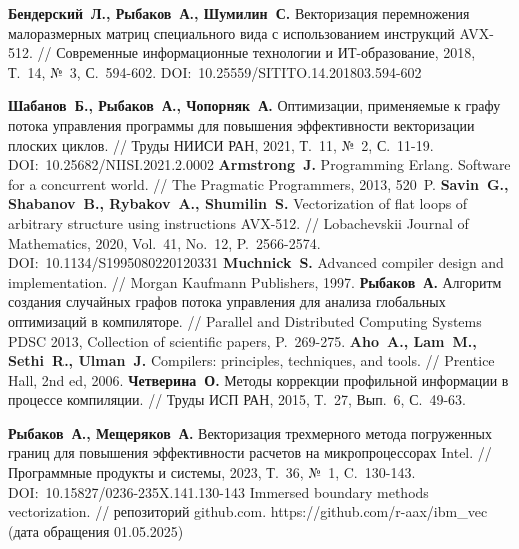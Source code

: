 \begin{thebibliography}{99}
%
\textbf{Бендерский~Л., Рыбаков~А., Шумилин~С.} Векторизация перемножения малоразмерных матриц специального вида с использованием инструкций AVX-512. // Современные информационные технологии и ИТ-образование, 2018, Т.~14, №~3, С.~594-602. DOI:~10.25559/SITITO.14.201803.594-602
%



%
\textbf{Шабанов~Б., Рыбаков~А., Чопорняк~А.} Оптимизации, применяемые к графу потока управления программы для повышения эффективности векторизации плоских циклов. // Труды НИИСИ РАН, 2021, Т.~11, №~2, С.~11-19. DOI:~10.25682/NIISI.2021.2.0002
%
\textbf{Armstrong~J.} Programming Erlang. Software for a concurrent world. // The Pragmatic Programmers, 2013, 520~P.
%
\textbf{Savin~G., Shabanov~B., Rybakov~A., Shumilin~S.} Vectorization of flat loops of arbitrary structure using instructions AVX-512. // Lobachevskii Journal of Mathematics, 2020, Vol.~41, No.~12, P.~2566-2574. DOI:~10.1134/S1995080220120331
%
\textbf{Muchnick~S.} Advanced compiler design and implementation. // Morgan Kaufmann Publishers, 1997.
%
\textbf{Рыбаков~А.} Алгоритм создания случайных графов потока управления для анализа глобальных оптимизаций в компиляторе. // Parallel and Distributed Computing Systems PDSC 2013, Collection of scientific papers, P.~269-275.
%
\textbf{Aho~A., Lam~M., Sethi~R., Ulman~J.} Compilers: principles, techniques, and tools. // Prentice Hall, 2nd ed, 2006.
%
\textbf{Четверина~О.} Методы коррекции профильной информации в процессе компиляции. // Труды ИСП РАН, 2015, Т.~27, Вып.~6, С.~49-63.
%



%
\textbf{Рыбаков~А., Мещеряков~А.} Векторизация трехмерного метода погруженных границ для повышения эффективности расчетов на микропроцессорах Intel. // Программные продукты и системы, 2023, Т.~36, №~1, C.~130-143. DOI:~10.15827/0236-235X.141.130-143
%
Immersed boundary methods vectorization. // репозиторий github.com. https://github.com/r-aax/ibm\_vec (дата обращения 01.05.2025)
%




\end{thebibliography}
